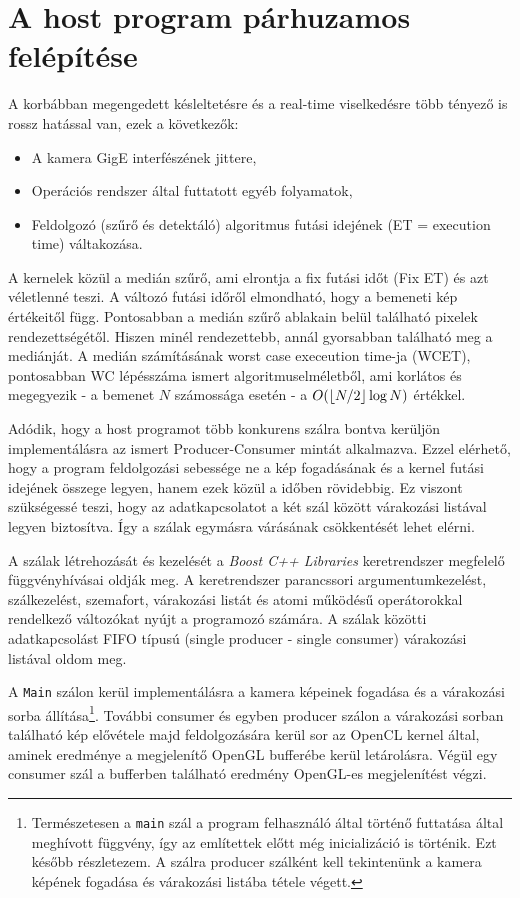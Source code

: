 \section{A host program párhuzamos felépítése} \label{sec:parallel}
	A korbábban megengedett késleltetésre és a real-time
        viselkedésre több tényező is rossz hatással van, ezek a következők:
	\begin{itemize}[noitemsep]
	  \item A kamera GigE interfészének jittere,
	  \item Operációs rendszer által futtatott egyéb folyamatok,
	  \item Feldolgozó (szűrő és detektáló) algoritmus futási idejének (ET = execution time) váltakozása. 
	\end{itemize}
	A kernelek közül a medián szűrő, ami elrontja a fix futási időt (Fix ET) és azt véletlenné teszi.
	A változó futási időről elmondható, hogy a bemeneti kép értékeitől függ. Pontosabban a medián szűrő ablakain belül található
	pixelek rendezettségétől. Hiszen minél rendezettebb, annál gyorsabban található meg a mediánját.
	A medián számításának worst case execeution time-ja (WCET), pontosabban WC lépésszáma ismert algoritmuselméletből, ami korlátos
	és megegyezik - a bemenet $N$ számossága esetén - a $O(\lfloor N/2\rfloor \log N)$ értékkel.
	
	Adódik, hogy a host programot több konkurens szálra bontva kerüljön implementálásra az ismert Producer-Consumer
	\cite{EWD:EWD329pub} mintát alkalmazva. Ezzel elérhető, hogy a program feldolgozási sebessége ne a kép fogadásának és a kernel
	futási idejének összege legyen, hanem ezek közül a időben rövidebbig.
	Ez viszont szükségessé teszi, hogy az adatkapcsolatot a két szál között várakozási listával legyen biztosítva.
	Így a szálak egymásra várásának csökkentését lehet elérni.
	
	A szálak létrehozását és kezelését a \textit{Boost C++ Libraries} \cite{boost} keretrendszer
	megfelelő függvényhívásai oldják meg. A keretrendszer parancssori argumentumkezelést, szálkezelést, szemafort, várakozási
	listát és atomi működésű operátorokkal rendelkező változókat nyújt a programozó számára.
	A szálak közötti adatkapcsolást FIFO típusú (single producer - single consumer) várakozási listával oldom meg.
	
	A \texttt{Main} szálon kerül implementálásra a kamera képeinek fogadása és a várakozási sorba állítása\footnote{Természetesen a
	\texttt{main} szál a program felhasználó által történő
        futtatása által meghívott függvény, így az említettek előtt
        még inicializáció is történik. Ezt később részletezem. A szálra producer szálként kell tekintenünk a kamera képének fogadása és
	várakozási listába tétele végett.}.
	További consumer és egyben producer szálon a várakozási sorban található kép elővétele majd feldolgozására kerül sor az
	OpenCL kernel által, aminek eredménye a megjelenítő OpenGL bufferébe kerül letárolásra.
	Végül egy consumer szál a bufferben található eredmény OpenGL-es megjelenítést végzi.
	
